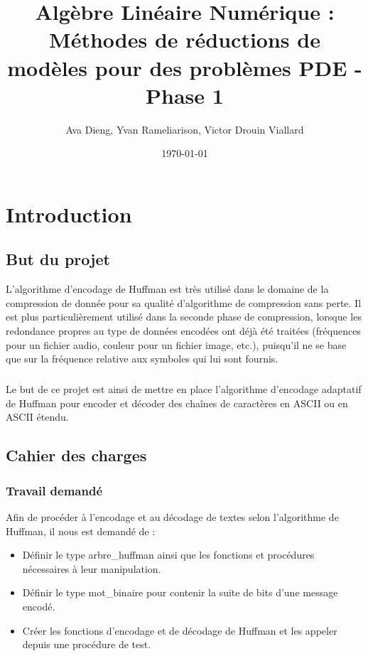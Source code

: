 \documentclass{book}
\title{Algèbre Linéaire Numérique : Méthodes de réductions de modèles pour des problèmes PDE - Phase 1}
\author{Ava Dieng, Yvan Rameliarison, Victor Drouin Viallard}
\date{\today}
\begin{document}
 
\maketitle
 
\tableofcontents




\chapter{Introduction}

\section{But du projet}
L'algorithme d'encodage de Huffman est très utilisé dans le domaine de la compression de donnée pour sa qualité d'algorithme de compression sans perte. Il est plus particulièrement utilisé dans la seconde phase de compression, lorsque les redondance propres au type de données encodées ont déjà été traitées (fréquences pour un fichier audio, couleur pour un fichier image, etc.), puisqu'il ne se base que sur la fréquence relative aux symboles qui lui sont fournis.
\paragraph{}
Le but de ce projet est ainsi de mettre en place l'algorithme d'encodage adaptatif de Huffman pour encoder et décoder des chaînes de caractères en ASCII ou en ASCII étendu.

\section{Cahier des charges}
\subsection*{Travail demandé}
Afin de procéder à l'encodage et au décodage de textes selon l'algorithme de Huffman, il nous est demandé de : 
\begin{itemize}
	\item Définir le type arbre\_huffman ainsi que les fonctions et procédures nécessaires à leur manipulation.
	\item Définir le type mot\_binaire pour contenir la suite de bits d'une message encodé.
	\item Créer les fonctions d'encodage et de décodage de Huffman et les appeler depuis une procédure de test.
\end{itemize}
\end{document}
